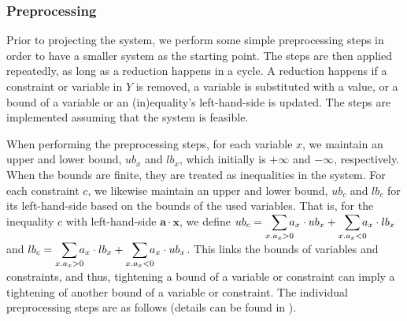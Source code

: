\documentclass[citeauthoryear]{llncs}
\newcommand{\ve}{\mathbf}
\begin{document}
\subsubsection{Preprocessing}
Prior to projecting the system, we perform some simple preprocessing steps in order to have a smaller system as the starting point. The steps are then applied repeatedly, as long as a reduction happens in a cycle. A reduction happens if a constraint or variable in $Y$ is removed, a variable is substituted with a value, or a bound of a variable or an (in)equality's left-hand-side is updated. The steps are implemented assuming that the system is feasible.

When performing the preprocessing steps, for each variable $x$, we maintain an upper and lower bound, $ub_x$ and $lb_x$, which initially is $+\infty$ and $-\infty$, respectively. When the bounds are finite, they are treated as inequalities in the system. For each constraint $c$, we likewise maintain an upper and lower bound, $ub_c$ and $lb_c$ for its left-hand-side {based on the bounds of the used variables}. That is, for the inequality $c$ with left-hand-side $\ve{a}\cdot\ve{x}$, we define $ub_c = \smashoperator[r]{\sum_{x. a_x>0}}a_x\cdot ub_x + \smashoperator[r]{\sum_{x.a_x<0}}a_x\cdot lb_x$ and $lb_c = \smashoperator[r]{\sum_{x. a_x>0}}a_x\cdot lb_x + \smashoperator[r]{\sum_{x.a_x<0}}a_x\cdot ub_x$. 
This links the bounds of variables and constraints, and thus, tightening a bound of a variable or constraint can imply a tightening of another bound of a variable or constraint. The individual preprocessing steps are as follows (details can be found in \cite{MyTechRep}). 
\end{document}
